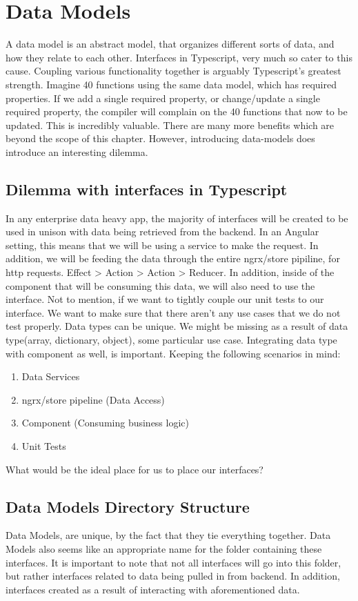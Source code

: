 \chapter{ Data Models }


A data model is an abstract model, that organizes different sorts of data,
and how they relate to each other. Interfaces in Typescript, very much so cater
to this cause. Coupling various functionality together is arguably Typescript's
greatest strength. Imagine 40 functions using the same data model, which has
required properties. If we add a single required property, or change/update
a single required property, the compiler will complain on the 40 functions that
now to be updated. This is incredibly valuable. There are many more benefits
which are beyond the scope of this chapter. However, introducing data-models
does introduce an interesting dilemma.

\section{Dilemma with interfaces in Typescript}
In any enterprise data heavy app, the majority of interfaces will
be created to be used in unison with data being retrieved from the backend.
In an Angular setting, this means that we will be using a service to make the
request. In addition, we will be feeding the data through the entire ngrx/store
pipiline, for http requests. Effect > Action > Action > Reducer. In addition,
inside of the component that will be consuming this data, we will also need
to use the interface. Not to mention, if we want to tightly couple our unit
tests to our interface. We want to make sure that there aren't any use cases
that we do not test properly. Data types can be unique. We might be missing as a result of data type(array, dictionary, object), some particular use case.
Integrating data type with component as well, is important. Keeping the
following scenarios in mind:
\begin{enumerate}
  \item Data Services
  \item ngrx/store pipeline (Data Access)
  \item Component (Consuming business logic)
  \item Unit Tests
\end{enumerate}

What would be the ideal place for us to place our interfaces?

\section{Data Models Directory Structure}
Data Models, are unique, by the fact that they tie everything together. Data
Models also seems like an appropriate name for the folder containing these interfaces. It is important to note that not all interfaces will go into this folder, but rather interfaces related to data being pulled in from backend. In addition, interfaces created as a result of interacting with aforementioned
data.

